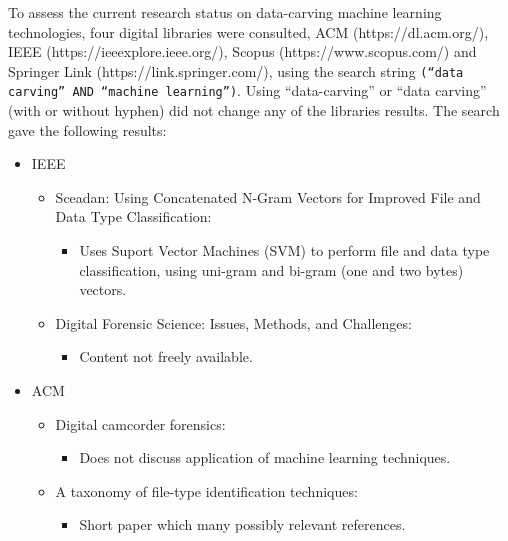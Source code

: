 To assess the current research status on data-carving machine learning technologies, four digital libraries were consulted, ACM (https://dl.acm.org/), IEEE (https://ieeexplore.ieee.org/), Scopus (https://www.scopus.com/) and Springer Link (https://link.springer.com/), using the search string 
{\texttt{(``data carving'' AND ``machine learning'')}}. Using ``data-carving'' or ``data carving'' (with or without hyphen) did not change any of the libraries results. The search gave the following results:

\begin{itemize}
    \item IEEE
    \begin{itemize}
        \item \cite{6567922} Sceadan: Using Concatenated N-Gram Vectors for Improved File and Data Type Classification:
        \begin{itemize}
            \item Uses Suport Vector Machines (SVM) to perform file and data type classification, using uni-gram and bi-gram (one and two bytes) vectors.
        \end{itemize}
        \item \cite{7809443} Digital Forensic Science: Issues, Methods, and Challenges:
        \begin{itemize}
            \item Content not freely available.
        \end{itemize}
    \end{itemize}
\end{itemize}

\begin{itemize}
    \item ACM
    \begin{itemize}
        \item \cite{Ariffin:2013:DCF:2525483.2525488} Digital camcorder forensics:
        \begin{itemize}
            \item Does not discuss application of machine learning techniques.
        \end{itemize}
        \item \cite{Alamri:2014:TFI:2638404.2638524} A taxonomy of file-type identification techniques:
        \begin{itemize}
            \item Short paper which many possibly relevant references.
        \end{itemize}
    \end{itemize}
\end{itemize}

